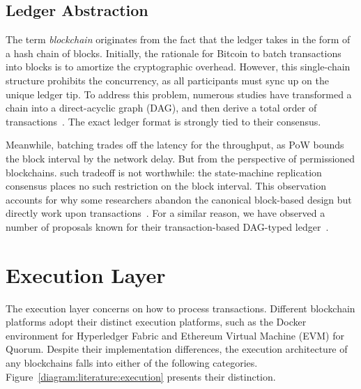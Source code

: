 \subsection{Ledger Abstraction}
The term \textit{blockchain} originates from the fact that the ledger takes in the form of a hash chain of blocks. 
Initially, the rationale for Bitcoin to batch transactions into blocks is to amortize the cryptographic overhead.
However, this single-chain structure prohibits the concurrency, as all participants must sync up on the unique ledger tip. 
To address this problem, numerous studies have transformed a chain into a direct-acyclic graph (DAG), and then derive a total order of transactions~\cite{sompolinsky2015secure,kiayias2017trees,li2018scaling,srivastava2018phantom}. 
The exact ledger format is strongly tied to their consensus. 

Meanwhile, batching trades off the latency for the throughput, as PoW bounds the block interval by the network delay. 
But from the perspective of permissioned blockchains. such tradeoff is not worthwhile: the state-machine replication consensus places no such restriction on the block interval. 
This observation accounts for why some researchers abandon the canonical block-based design but directly work upon transactions~\cite{istvan2018streamchain}. 
For a similar reason, we have observed a number of proposals known for their transaction-based DAG-typed ledger~\cite{lemahieu2018nano,churyumov2016byteball,divya2018iota}. 

\section{Execution Layer}
The execution layer concerns on how to process transactions. 
Different blockchain platforms adopt their distinct execution platforms, such as the Docker environment for Hyperledger Fabric and Ethereum Virtual Machine (EVM) for Quorum. 
Despite their implementation differences, the execution architecture of any blockchains falls into either of the following categories. Figure~\ref{diagram:literature:execution} presents their distinction. 

